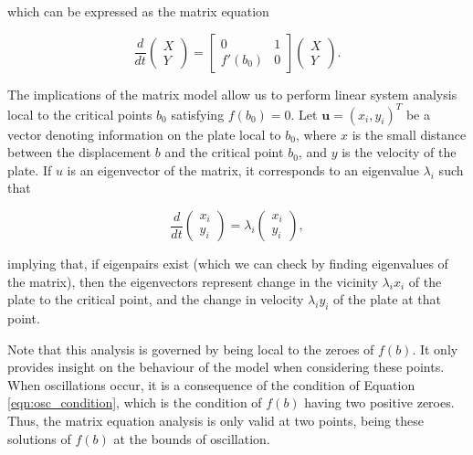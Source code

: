 \documentclass{article}
\begin{document}
which can be expressed as the matrix equation

\begin{equation}
    \frac{d}{dt}\begin{pmatrix}
        X \\
        Y
    \end{pmatrix} = \begin{bmatrix}
        0      & 1 \\
        f'(b_0) & 0
    \end{bmatrix} \begin{pmatrix}
        X \\
        Y
    \end{pmatrix}.
    \label{eqn:first_order_approximated_substituted_matrix}
\end{equation}


The implications of the matrix model allow us to perform linear system analysis local to the critical points $b_0$ satisfying $f(b_0) = 0.$
Let $\mathbf{u}=(x_i,y_i)^T$ be a vector denoting information on the plate local to $b_0$,
where $x$ is the small distance between the displacement $b$ and the critical point $b_0$,
and $y$ is the velocity of the plate.
If $u$ is an eigenvector of the matrix,
it corresponds to an eigenvalue $\lambda_i$ such that

\begin{equation}
	\frac{d}{dt} \begin{pmatrix}
		x_i \\
		y_i
	\end{pmatrix} = \lambda_i \begin{pmatrix}
	x_i \\
	y_i
\end{pmatrix},
\label{eqn:matrix_eigenvectors}
\end{equation}

implying that, if eigenpairs exist (which we can check by finding eigenvalues of the matrix),
then the eigenvectors represent change in the vicinity $\lambda_i x_i$ of the plate to the critical point,
and the change in velocity $\lambda_i y_i$ of the plate at that point.

Note that this analysis is governed by being local to the zeroes of $f(b)$.
It only provides insight on the behaviour of the model when considering these points.
When oscillations occur, it is a consequence of the condition of Equation \ref{eqn:osc_condition},
which is the condition of $f(b)$ having two positive zeroes.
Thus, the matrix equation analysis is only valid at two points,
being these solutions of $f(b)$ at the bounds of oscillation.
\end{document}
